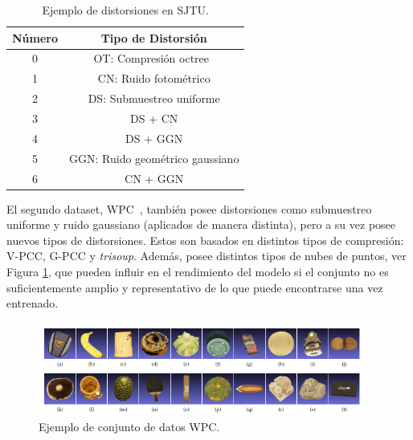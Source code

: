 \begin{table}[htp]
  \centering 
  \scriptsize
  \begin{tabular}{|c|c|}
    \hline
    \rowcolor[HTML]{FFC702}
    \textbf{Número} & \textbf{Tipo de Distorsión} \\ 
    \hline 
    0 & OT: Compresión octree~\cite{OctreeCompression} \\ 
    \hline 
    1 & CN: Ruido fotométrico\\ 
    \hline 
    2 & DS: Submuestreo uniforme \\
    \hline 
    3 & DS + CN \\
    \hline 
    4 & DS + GGN \\
    \hline 
    5 & GGN: Ruido geométrico gaussiano \\
    \hline 
    6 & CN + GGN \\ 
    \hline 
  \end{tabular}
  \caption{Ejemplo de distorsiones en SJTU.}
  \label{tab:SJTU}
\end{table}

El segundo dataset, WPC~\cite{WPC1, WPC2}, también posee distorsiones como submuestreo uniforme y 
ruido gaussiano (aplicados de manera distinta), pero a su vez posee nuevos tipos 
de distorsiones. Estos son basados en distintos tipos de compresión: V-PCC, G-PCC y \emph{trisoup}.
Además, posee distintos tipos de nubes de puntos, ver Figura \ref{fig:WPC}, que 
pueden influir en el rendimiento del modelo si el conjunto no es
suficientemente amplio y representativo de lo que puede encontrarse una vez entrenado. 

\begin{figure}[htp]
  \begin{center}
    \includegraphics[width=0.95\textwidth]{imagenes/chapter4/WPC}
  \end{center}
  \caption{Ejemplo de conjunto de datos WPC.}
  \label{fig:WPC}
\end{figure}

